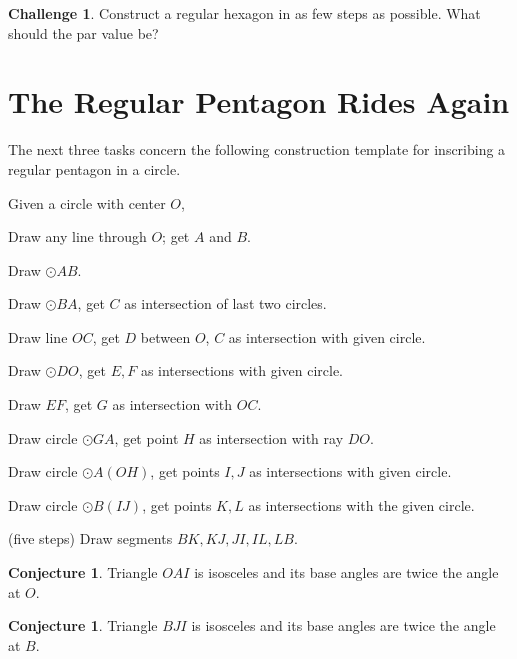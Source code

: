 \documentclass{tufte-handout}
\theoremstyle{definition}
\newtheorem{conjecture}[problem]{Conjecture}
\newtheorem{challenge}[problem]{Challenge}
\begin{document}
\begin{challenge}\label{chal:hexagon}
Construct a regular hexagon in as few steps as possible. What should the par value be?
\end{challenge}

\clearpage
\setcounter{section}{16}
\setcounter{problem}{0}

\section{The Regular Pentagon Rides Again}


The next three tasks concern the following construction template for inscribing a regular pentagon in a circle. 

\vspace{.5in}

Given a circle with center $O$,
\begin{compactenum}
\item Draw any line through $O$; get $A$ and $B$.
\item Draw $\odot AB$.
\item Draw $\odot BA$, get $C$ as intersection of last two circles.
\item Draw line $OC$, get $D$ between $O$, $C$ as intersection with given circle.
\item Draw $\odot DO$, get $E, F$ as intersections with given circle.
\item Draw $EF$, get $G$ as intersection with $OC$.
\item Draw circle $\odot GA$, get point $H$ as intersection with ray $DO$.
\item Draw circle $\odot A(OH)$, get points $I, J$ as intersections with given circle.
\item Draw circle $\odot B(IJ)$, get points $K, L$ as intersections with the given circle.
\item (five steps) Draw segments $BK, KJ, JI, IL, LB$.
\end{compactenum}


\begin{conjecture}\label{conj:pentagon-1}
Triangle $OAI$ is isosceles and its base angles are twice the angle at $O$.
\end{conjecture}

\begin{conjecture}\label{conj:pentagon-2}
Triangle $BJI$ is isosceles and its base angles are twice the angle at $B$.
\end{conjecture}
\end{document}
